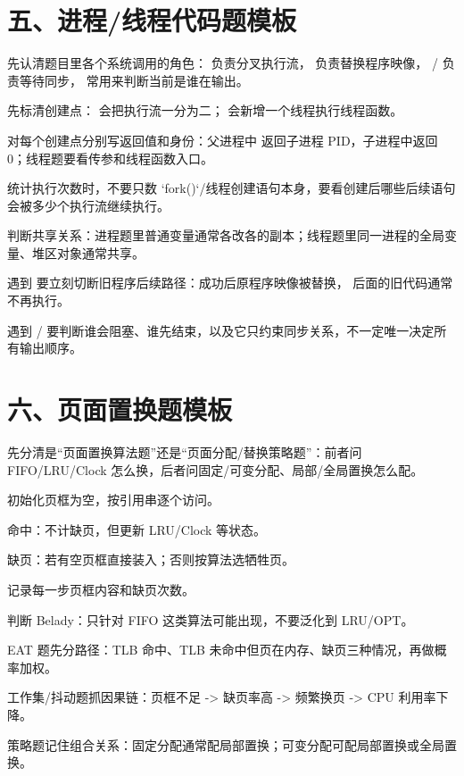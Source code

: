 \section*{五、进程/线程代码题模板}
{}
\begin{points}
  \item 先认清题目里各个系统调用的角色： 负责分叉执行流， 负责替换程序映像， /  负责等待同步， 常用来判断当前是谁在输出。
  \item 先标清创建点： 会把执行流一分为二； 会新增一个线程执行线程函数。
  \item 对每个创建点分别写返回值和身份：父进程中  返回子进程 PID，子进程中返回 0；线程题要看传参和线程函数入口。
  \item 统计执行次数时，不要只数 `fork()`/线程创建语句本身，要看创建后哪些后续语句会被多少个执行流继续执行。
  \item 判断共享关系：进程题里普通变量通常各改各的副本；线程题里同一进程的全局变量、堆区对象通常共享。
  \item 遇到  要立刻切断旧程序后续路径：成功后原程序映像被替换， 后面的旧代码通常不再执行。
  \item 遇到  /  要判断谁会阻塞、谁先结束，以及它只约束同步关系，不一定唯一决定所有输出顺序。
\end{points}

\section*{六、页面置换题模板}
{}
\begin{points}
  \item 先分清是“页面置换算法题”还是“页面分配/替换策略题”：前者问 FIFO/LRU/Clock 怎么换，后者问固定/可变分配、局部/全局置换怎么配。
  \item 初始化页框为空，按引用串逐个访问。
  \item 命中：不计缺页，但更新 LRU/Clock 等状态。
  \item 缺页：若有空页框直接装入；否则按算法选牺牲页。
  \item 记录每一步页框内容和缺页次数。
  \item 判断 Belady：只针对 FIFO 这类算法可能出现，不要泛化到 LRU/OPT。
  \item EAT 题先分路径：TLB 命中、TLB 未命中但页在内存、缺页三种情况，再做概率加权。
  \item 工作集/抖动题抓因果链：页框不足 -> 缺页率高 -> 频繁换页 -> CPU 利用率下降。
  \item 策略题记住组合关系：固定分配通常配局部置换；可变分配可配局部置换或全局置换。
\end{points}

